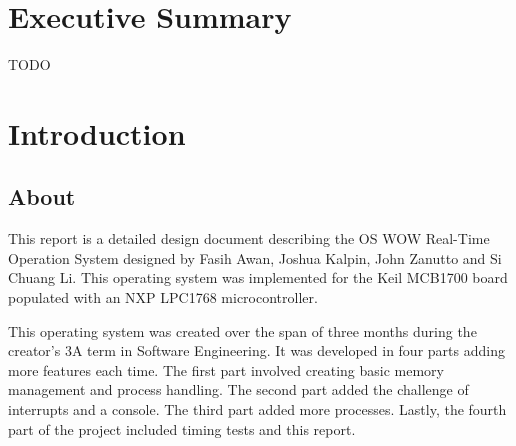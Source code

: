 \documentclass[se]{uw-wkrpt}
\begin{document}
\frontmatter

\section{Executive Summary}
TODO

\tableofcontents
\listoffigures
\listoftables

\mainmatter

\section{Introduction}\label{sec:intro}

\subsection{About}

This report is a detailed design document describing the OS WOW Real-Time Operation System designed by Fasih Awan, Joshua Kalpin, John Zanutto and Si Chuang Li. This operating system was implemented for the Keil MCB1700 board populated with an NXP LPC1768 microcontroller. 

This operating system was created over the span of three months during the creator's 3A term in Software Engineering. It was developed in four parts adding more features each time. The first part involved creating basic memory management and process handling. The second part added the challenge of interrupts and a console. The third part added more processes. Lastly, the fourth part of the project included timing tests and this report.
\end{document}
